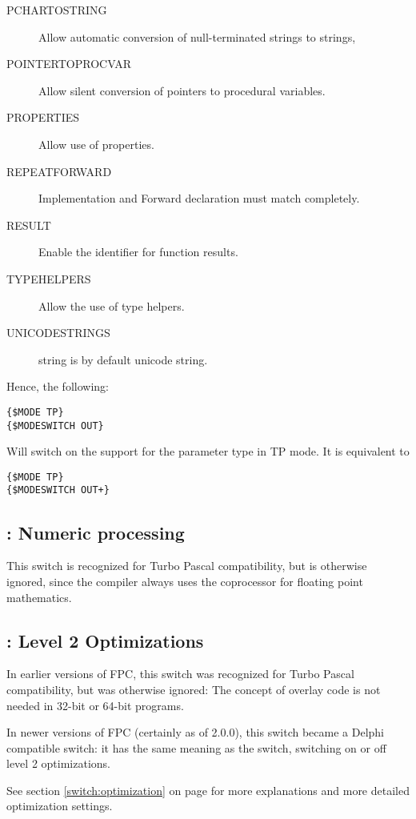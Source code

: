 \begin{description}
\item[PCHARTOSTRING] Allow automatic conversion of null-terminated strings to strings,
\item[POINTERTOPROCVAR] Allow silent conversion of pointers to procedural variables.
\item[PROPERTIES] Allow use of properties.
\item[REPEATFORWARD] Implementation and Forward declaration must match completely.
\item[RESULT] Enable the  identifier for function results.
\item[TYPEHELPERS] Allow the use of type helpers.
\item[UNICODESTRINGS] string is by default unicode string.
\end{description}

Hence, the following:
\begin{verbatim}
{$MODE TP}
{$MODESWITCH OUT}
\end{verbatim}
Will switch on the support for the  parameter type in TP mode. It
is equivalent to
\begin{verbatim}
{$MODE TP}
{$MODESWITCH OUT+}
\end{verbatim}

\subsection{ : Numeric processing }

This switch is recognized for Turbo Pascal compatibility, but is otherwise
ignored, since the compiler always uses the coprocessor for floating point
mathematics.

\subsection{ : Level 2 Optimizations }

In earlier versions of FPC, this switch was recognized for Turbo Pascal 
compatibility, but was otherwise ignored: The concept of overlay code 
is not needed in 32-bit or 64-bit programs.

In newer versions of FPC (certainly as of 2.0.0), this switch became a
Delphi compatible switch: it has the same meaning as the
 switch, switching on or off level 2 optimizations.

See section \ref{switch:optimization} on page \pageref{switch:optimization}
for more explanations and more detailed optimization settings.

